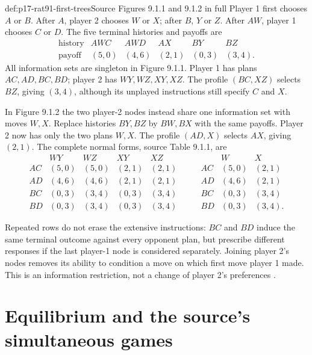 \begin{hbdefinition}{def:p17-rat91-first-trees}{Source Figures 9.1.1 and 9.1.2 in full}
Player 1 first chooses \(A\) or \(B\). After \(A\), player 2
chooses \(W\) or \(X\); after \(B\), \(Y\) or \(Z\).
After \(AW\), player 1 chooses \(C\) or \(D\).
The five terminal histories and payoffs are
\[
\begin{array}{c|ccccc}
\text{history}&AWC&AWD&AX&BY&BZ\\\hline
\text{payoff}&(5,0)&(4,6)&(2,1)&(0,3)&(3,4).
\end{array}
\]
All information sets are singleton in Figure 9.1.1. Player 1 has
plans \(AC,AD,BC,BD\); player 2 has \(WY,WZ,XY,XZ\).
The profile \((BC,XZ)\) selects \(BZ\), giving \((3,4)\),
although its unplayed instructions still specify \(C\) and \(X\).

In Figure 9.1.2 the two player-2 nodes instead share one information
set with moves \(W,X\). Replace histories \(BY,BZ\) by \(BW,BX\)
with the same payoffs. Player 2 now has only the two plans \(W,X\).
The profile \((AD,X)\) selects \(AX\), giving \((2,1)\).
The complete normal forms, source Table 9.1.1, are
\[
\begin{array}{c|cccc}
 &WY&WZ&XY&XZ\\\hline
 AC&(5,0)&(5,0)&(2,1)&(2,1)\\
 AD&(4,6)&(4,6)&(2,1)&(2,1)\\
 BC&(0,3)&(3,4)&(0,3)&(3,4)\\
 BD&(0,3)&(3,4)&(0,3)&(3,4)
\end{array}
\qquad
\begin{array}{c|cc}
 &W&X\\\hline
 AC&(5,0)&(2,1)\\AD&(4,6)&(2,1)\\
 BC&(0,3)&(3,4)\\BD&(0,3)&(3,4).
\end{array}
\]
\end{hbdefinition}

Repeated rows do not erase the extensive instructions: \(BC\) and
\(BD\) induce the same terminal outcome against every opponent plan,
but prescribe different responses if the last player-1 node is
considered separately. Joining player 2's nodes removes its ability
to condition a move on which first move player 1 made. This is an
information restriction, not a change of player 2's preferences
\parencite[pp.~530--532]{AlbertKliemt2021ClassicalGameTheory}.

\section{Equilibrium and the source's simultaneous games}

